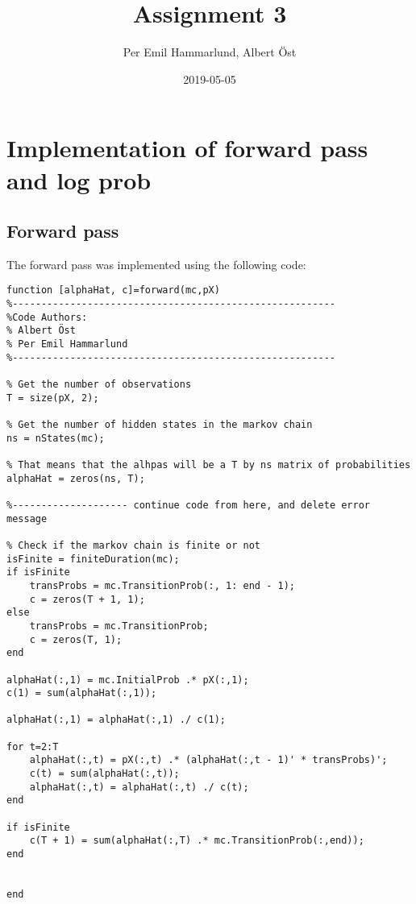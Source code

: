 \documentclass[]{article}
\title{Assignment 3}
\author{Per Emil Hammarlund, Albert Öst}
\date{2019-05-05}
\begin{document}
\maketitle

\tableofcontents

\newpage

\section{Implementation of forward pass and log
prob}\label{implementation-of-forward-pass-and-log-prob}

\subsection{Forward pass}\label{forward-pass}

The forward pass was implemented using the following code:

\begin{verbatim}
function [alphaHat, c]=forward(mc,pX)
%--------------------------------------------------------
%Code Authors:
% Albert Öst
% Per Emil Hammarlund
%--------------------------------------------------------

% Get the number of observations
T = size(pX, 2);

% Get the number of hidden states in the markov chain
ns = nStates(mc);

% That means that the alhpas will be a T by ns matrix of probabilities
alphaHat = zeros(ns, T);

%-------------------- continue code from here, and delete error message

% Check if the markov chain is finite or not
isFinite = finiteDuration(mc);
if isFinite
    transProbs = mc.TransitionProb(:, 1: end - 1);
    c = zeros(T + 1, 1);
else
    transProbs = mc.TransitionProb;
    c = zeros(T, 1);
end

alphaHat(:,1) = mc.InitialProb .* pX(:,1);
c(1) = sum(alphaHat(:,1));

alphaHat(:,1) = alphaHat(:,1) ./ c(1);

for t=2:T
    alphaHat(:,t) = pX(:,t) .* (alphaHat(:,t - 1)' * transProbs)';
    c(t) = sum(alphaHat(:,t));
    alphaHat(:,t) = alphaHat(:,t) ./ c(t);
end

if isFinite
    c(T + 1) = sum(alphaHat(:,T) .* mc.TransitionProb(:,end));
end


end
\end{verbatim}
\end{document}
